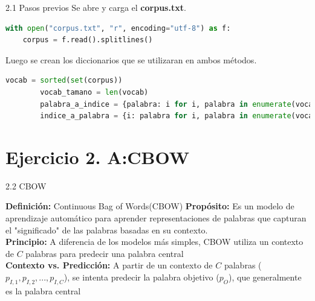 \documentclass{beamer}
\begin{document}
	
\begin{frame}[fragile]{2.1 Pasos previos}
	\justifying
	Se abre y carga el \textbf{corpus.txt}.
	
	\begin{lstlisting}[language=Python]
with open("corpus.txt", "r", encoding="utf-8") as f:
	corpus = f.read().splitlines()
	\end{lstlisting}
	Luego se crean los diccionarios que se utilizaran en ambos métodos.
	\begin{lstlisting}[language=Python]
    vocab = sorted(set(corpus))
		vocab_tamano = len(vocab)
		palabra_a_indice = {palabra: i for i, palabra in enumerate(vocab)}
		indice_a_palabra = {i: palabra for i, palabra in enumerate(vocab)}
	\end{lstlisting}

\end{frame}
	
	
\section{Ejercicio 2. A:CBOW}
	
\begin{frame}[fragile]{2.2 CBOW}
	\begin{block}{\textbf{Definición:} Continuous Bag of Words(CBOW)}
	\justifying
	\vspace{0.1cm}
	\textbf{Propósito:} Es un modelo de aprendizaje automático para aprender representaciones de palabras que capturan el "significado" de las palabras basadas en su contexto.\\
	\vspace{0.1cm}
	\textbf{Principio:} A diferencia de los modelos más simples, CBOW utiliza un contexto de $C$ palabras para predecir una palabra central\\
	\vspace{0.1cm}
	\textbf{Contexto vs. Predicción:}  A partir de un contexto de $C$ palabras ($p_{I,1}, p_{I,2}, ..., p_{I,C}$), se intenta predecir la palabra objetivo ($p_O$), que generalmente es la palabra central
\end{block}
	
\end{frame}
	
\end{document}
